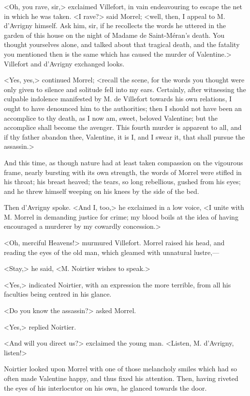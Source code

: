  <Oh, you rave, sir,> exclaimed Villefort, in vain endeavouring to escape the net in which he was taken.  <I rave?> said Morrel; <well, then, I appeal to M. d'Avrigny himself. Ask him, sir, if he recollects the words he uttered in the garden of this house on the night of Madame de Saint-Méran's death. You thought yourselves alone, and talked about that tragical death, and the fatality you mentioned then is the same which has caused the murder of Valentine.> Villefort and d'Avrigny exchanged looks. 

 <Yes, yes,> continued Morrel; <recall the scene, for the words you thought were only given to silence and solitude fell into my ears. Certainly, after witnessing the culpable indolence manifested by M. de Villefort towards his own relations, I ought to have denounced him to the authorities; then I should not have been an accomplice to thy death, as I now am, sweet, beloved Valentine; but the accomplice shall become the avenger. This fourth murder is apparent to all, and if thy father abandon thee, Valentine, it is I, and I swear it, that shall pursue the assassin.> 

 And this time, as though nature had at least taken compassion on the vigourous frame, nearly bursting with its own strength, the words of Morrel were stifled in his throat; his breast heaved; the tears, so long rebellious, gushed from his eyes; and he threw himself weeping on his knees by the side of the bed. 

 Then d'Avrigny spoke. <And I, too,> he exclaimed in a low voice, <I unite with M. Morrel in demanding justice for crime; my blood boils at the idea of having encouraged a murderer by my cowardly concession.> 

 <Oh, merciful Heavens!> murmured Villefort. Morrel raised his head, and reading the eyes of the old man, which gleamed with unnatural lustre,— 

 <Stay,> he said, <M. Noirtier wishes to speak.> 

 <Yes,> indicated Noirtier, with an expression the more terrible, from all his faculties being centred in his glance. 

 <Do you know the assassin?> asked Morrel. 

 <Yes,> replied Noirtier. 

 <And will you direct us?> exclaimed the young man. <Listen, M. d'Avrigny, listen!> 

 Noirtier looked upon Morrel with one of those melancholy smiles which had so often made Valentine happy, and thus fixed his attention. Then, having riveted the eyes of his interlocutor on his own, he glanced towards the door. 

